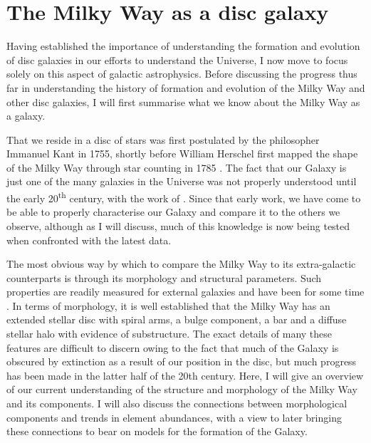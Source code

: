 \section{The Milky Way as a disc galaxy}
\label{sec:mwadg}

Having established the importance of understanding the formation and evolution of disc galaxies in our efforts to understand the Universe, I now move to focus solely on this aspect of galactic astrophysics. Before discussing the progress thus far in understanding the history of formation and evolution of the Milky Way and other disc galaxies, I will first summarise what we know about the Milky Way as a galaxy. 

That we reside in a disc of stars was first postulated by the philosopher Immanuel Kant in 1755, shortly before William Herschel first mapped the shape of the Milky Way through star counting in 1785 \citep{Herschel01011785}. The fact that our Galaxy is just one of the many galaxies in the Universe was not properly understood until the early 20\textsuperscript{th} century, with the work of \citet{1929ApJ....69..103H}. Since that early work, we have come to be able to properly characterise our Galaxy and compare it to the others we observe, although as I will discuss, much of this knowledge is now being tested when confronted with the latest data.

The most obvious way by which to compare the Milky Way to its extra-galactic counterparts is through its morphology and structural parameters. Such properties are readily measured for external galaxies and have been for some time \citep[e.g.][]{1959HDP....53..311D}. In terms of morphology, it is well established that the Milky Way has an extended stellar disc with spiral arms, a bulge component, a bar and a diffuse stellar halo with evidence of substructure. The exact details of many these features are difficult to discern owing to the fact that much of the Galaxy is obscured by extinction as a result of our position in the disc, but much progress has been made in the latter half of the 20th century. Here, I will give an overview of our current understanding of the structure and morphology of the Milky Way and its components. I will also discuss the connections between morphological components and trends in element abundances, with a view to later bringing these connections to bear on models for the formation of the Galaxy.

